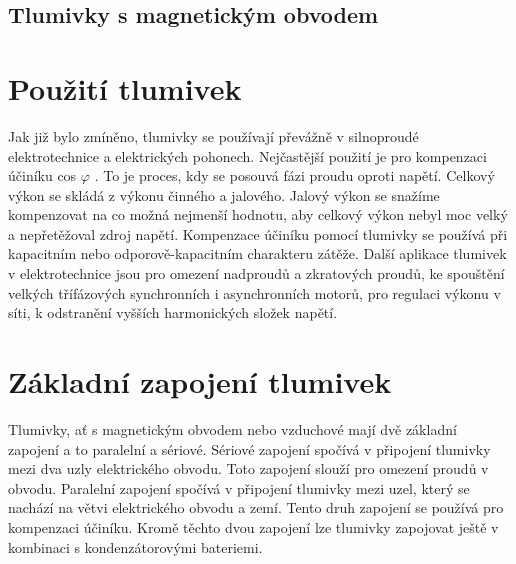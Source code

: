 \subsection{Tlumivky s magnetickým obvodem}
\section{Použití tlumivek}
Jak již bylo zmíněno, tlumivky se používají převážně v silnoproudé elektrotechnice a elektrických pohonech. Nejčastější použití je pro kompenzaci účiníku cos $\varphi$ . To je proces, kdy se posouvá fázi proudu oproti napětí. Celkový výkon se skládá z výkonu činného a jalového. Jalový výkon se snažíme kompenzovat na co možná nejmenší hodnotu, aby celkový výkon nebyl moc velký a nepřetěžoval zdroj napětí. Kompenzace účiníku pomocí tlumivky se používá při kapacitním nebo odporově-kapacitním charakteru zátěže. Další aplikace tlumivek v elektrotechnice jsou pro omezení nadproudů a zkratových proudů, ke spouštění velkých třífázových synchronních i asynchronních motorů, pro regulaci výkonu v síti, k odstranění vyšších harmonických složek napětí.
\section{Základní zapojení tlumivek} Tlumivky, ať s magnetickým obvodem nebo vzduchové mají dvě základní zapojení a to paralelní a sériové. Sériové zapojení spočívá v připojení tlumivky mezi dva uzly elektrického obvodu. Toto zapojení slouží pro omezení proudů v obvodu. Paralelní zapojení spočívá  v připojení tlumivky mezi uzel, který se nachází na větvi elektrického obvodu a zemí. Tento druh zapojení se používá pro kompenzaci účiníku. Kromě těchto dvou zapojení lze tlumivky zapojovat ještě v kombinaci s kondenzátorovými bateriemi.